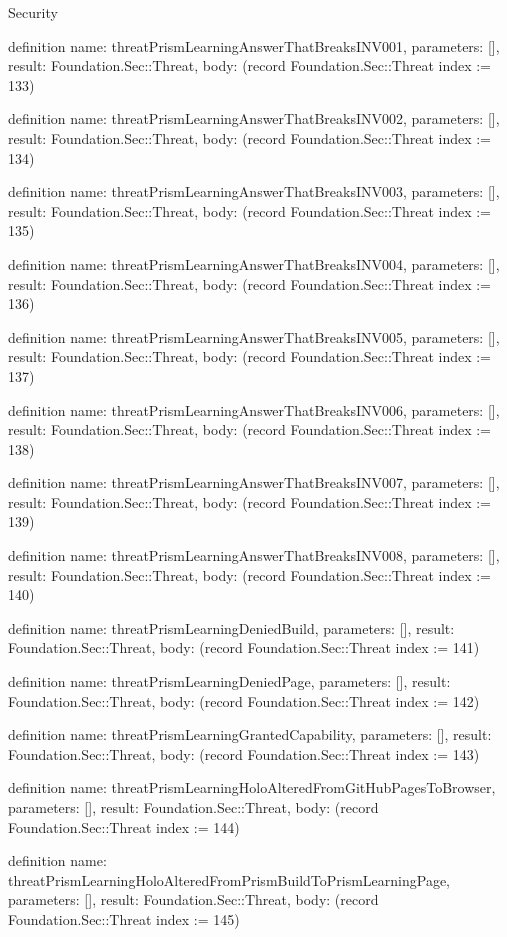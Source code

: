 \begin{lexlean}{Security}
\begin{semanticmodule}
definition{
  name: threatPrismLearningAnswerThatBreaksINV001,
  parameters: [],
  result: Foundation.Sec::Threat,
  body: (record Foundation.Sec::Threat {index := 133})
}

definition{
  name: threatPrismLearningAnswerThatBreaksINV002,
  parameters: [],
  result: Foundation.Sec::Threat,
  body: (record Foundation.Sec::Threat {index := 134})
}

definition{
  name: threatPrismLearningAnswerThatBreaksINV003,
  parameters: [],
  result: Foundation.Sec::Threat,
  body: (record Foundation.Sec::Threat {index := 135})
}

definition{
  name: threatPrismLearningAnswerThatBreaksINV004,
  parameters: [],
  result: Foundation.Sec::Threat,
  body: (record Foundation.Sec::Threat {index := 136})
}

definition{
  name: threatPrismLearningAnswerThatBreaksINV005,
  parameters: [],
  result: Foundation.Sec::Threat,
  body: (record Foundation.Sec::Threat {index := 137})
}

definition{
  name: threatPrismLearningAnswerThatBreaksINV006,
  parameters: [],
  result: Foundation.Sec::Threat,
  body: (record Foundation.Sec::Threat {index := 138})
}

definition{
  name: threatPrismLearningAnswerThatBreaksINV007,
  parameters: [],
  result: Foundation.Sec::Threat,
  body: (record Foundation.Sec::Threat {index := 139})
}

definition{
  name: threatPrismLearningAnswerThatBreaksINV008,
  parameters: [],
  result: Foundation.Sec::Threat,
  body: (record Foundation.Sec::Threat {index := 140})
}

definition{
  name: threatPrismLearningDeniedBuild,
  parameters: [],
  result: Foundation.Sec::Threat,
  body: (record Foundation.Sec::Threat {index := 141})
}

definition{
  name: threatPrismLearningDeniedPage,
  parameters: [],
  result: Foundation.Sec::Threat,
  body: (record Foundation.Sec::Threat {index := 142})
}

definition{
  name: threatPrismLearningGrantedCapability,
  parameters: [],
  result: Foundation.Sec::Threat,
  body: (record Foundation.Sec::Threat {index := 143})
}

definition{
  name: threatPrismLearningHoloAlteredFromGitHubPagesToBrowser,
  parameters: [],
  result: Foundation.Sec::Threat,
  body: (record Foundation.Sec::Threat {index := 144})
}

definition{
  name: threatPrismLearningHoloAlteredFromPrismBuildToPrismLearningPage,
  parameters: [],
  result: Foundation.Sec::Threat,
  body: (record Foundation.Sec::Threat {index := 145})
}


\end{semanticmodule}
\end{lexlean}
